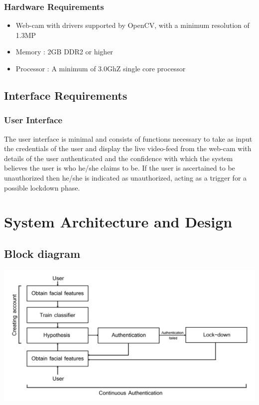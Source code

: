 \documentclass[12pt]{article}			%
\begin{document}
\subsubsection{ Hardware Requirements }
\begin{itemize}
\item Web-cam with drivers supported by OpenCV, with a minimum resolution of 1.3MP
\item Memory : 2GB DDR2 or higher
\item Processor : A minimum of 3.0GhZ single core processor
\end{itemize}

\subsection{ Interface Requirements }
\subsubsection{ User Interface }
The user interface is minimal and consists of functions necessary to take as input the credentials of the user and display the live video-feed from the web-cam with details of the user authenticated and the confidence with which the system believes the user is who he/she claims to be. If the user is ascertained to be unauthorized then he/she is indicated as unauthorized, acting as a trigger for a possible lockdown phase.

\section{ System Architecture and Design }  
\subsection{ Block diagram }
\begin{center}
    \includegraphics[scale=0.8]{block.png}
\end{center}
\end{document}
